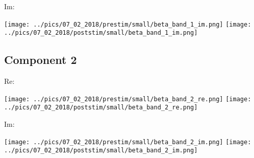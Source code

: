 \documentclass{article}
\begin{document}
Im:

\hspace{2cm}
\texttt{[image: ../pics/07\_02\_2018/prestim/small/beta\_band\_1\_im.png]}
\hspace{2cm}
\texttt{[image: ../pics/07\_02\_2018/poststim/small/beta\_band\_1\_im.png]}

\subsection*{Component 2}
Re:

\hspace{2cm}
\texttt{[image: ../pics/07\_02\_2018/prestim/small/beta\_band\_2\_re.png]}
\hspace{2cm}
\texttt{[image: ../pics/07\_02\_2018/poststim/small/beta\_band\_2\_re.png]}

Im:

\hspace{2cm}
\texttt{[image: ../pics/07\_02\_2018/prestim/small/beta\_band\_2\_im.png]}
\hspace{2cm}
\texttt{[image: ../pics/07\_02\_2018/poststim/small/beta\_band\_2\_im.png]}


\end{document}
